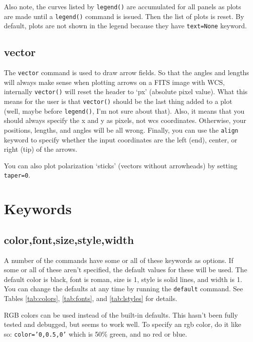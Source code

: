 \documentclass[12pt]{article}
\begin{document}
Also note, the curves listed by \texttt{legend()} are accumulated for all
panels as plots are made until a \texttt{legend()} command is issued.  Then
the list of plots is reset.  By default, plots are not shown in the legend
because they have \texttt{text=None} keyword.

\subsection{vector}

The \texttt{vector} command is used to draw arrow fields.  So that the angles
and lengths will always make sense when plotting arrows on a FITS image with
WCS, internally \texttt{vector()} will reset the header to `px' (absolute pixel
value).  What this means for the user is that \texttt{vector()} should be the
last thing added to a plot (well, maybe before \texttt{legend()}, I'm not sure
about that).  Also, it means that you should always specify the x and y as
pixels, not wcs coordinates.  Otherwise, your positions, lengths, and angles will
be all wrong.  Finally, you can use the \texttt{align} keyword to  specify
whether the input coordinates are the left (end), center, or right (tip) of the
arrows.

You can also plot polarization `sticks' (vectors without arrowheads) by 
setting \texttt{taper=0}.

\section{Keywords}

\subsection{color,font,size,style,width}

A number of the commands have some or all of these keywords as options.  If
some or all of these aren't specified, the default values for these will be
used.  The default color is black, font is roman, size is 1, style is
solid lines, and width is 1.  You can change the defaults at any time by
running the \texttt{default} command.  See Tables \ref{tab:colors},
\ref{tab:fonts}, and \ref{tab:lstyles} for details.

RGB colors can be used instead of the built-in defaults.  This hasn't been
fully tested and debugged, but seems to work well.  To specify an rgb color,
do it like so: \texttt{color='0,0.5,0'} which is 50\% green, and no red or
blue.
\end{document}
